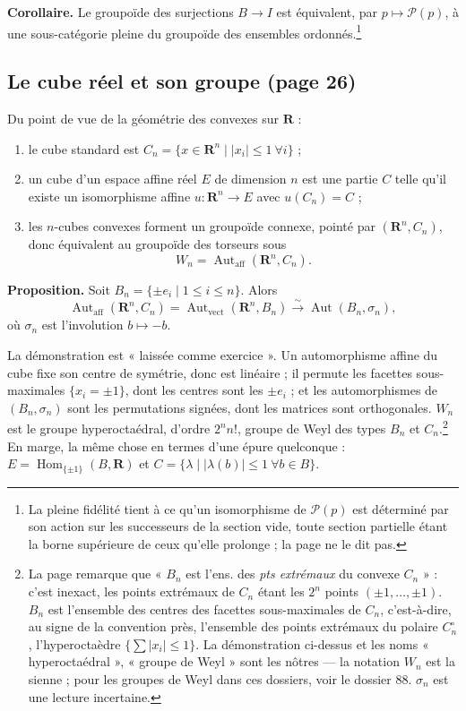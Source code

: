 \documentclass[11pt,a4paper]{article}
\begin{document}
\textbf{Corollaire.} Le groupoïde des surjections $B \to I$ est équivalent, par
$p \mapsto \mathcal{P}(p)$, à une sous-catégorie pleine du groupoïde des
ensembles ordonnés.\footnote{La pleine fidélité tient à ce qu'un isomorphisme
de $\mathcal{P}(p)$ est déterminé par son action sur les successeurs de la
section vide, toute section partielle étant la borne supérieure de ceux
qu'elle prolonge ; la page ne le dit pas.}

\subsection*{Le cube réel et son groupe (page 26)}

Du point de vue de la géométrie des convexes sur $\mathbf{R}$ :
\begin{enumerate}
\item[(a)] le cube standard est $C_{n} = \{x \in \mathbf{R}^{n} \mid |x_{i}| \leq 1
\ \forall i\}$ ;
\item[(b)] un cube d'un espace affine réel $E$ de dimension $n$ est une partie
$C$ telle qu'il existe un isomorphisme affine $u : \mathbf{R}^{n} \to E$ avec
$u(C_{n}) = C$ ;
\item[(c)] les $n$-cubes convexes forment un groupoïde connexe, pointé par
$(\mathbf{R}^{n}, C_{n})$, donc équivalent au groupoïde des torseurs sous
\[
  W_{n} = \operatorname{Aut}_{\mathrm{aff}}(\mathbf{R}^{n}, C_{n}).
\]
\end{enumerate}

\textbf{Proposition.} Soit $B_{n} = \{\pm e_{i} \mid 1 \leq i \leq n\}$. Alors
\[
  \operatorname{Aut}_{\mathrm{aff}}(\mathbf{R}^{n}, C_{n}) =
  \operatorname{Aut}_{\mathrm{vect}}(\mathbf{R}^{n}, B_{n}) \xrightarrow{\ \sim\ }
  \operatorname{Aut}(B_{n}, \sigma_{n}),
\]
où $\sigma_{n}$ est l'involution $b \mapsto -b$.

La démonstration est « laissée comme exercice ». Un automorphisme affine du cube
fixe son centre de symétrie, donc est linéaire ; il permute les facettes
sous-maximales $\{x_{i} = \pm 1\}$, dont les centres sont les $\pm e_{i}$ ; et
les automorphismes de $(B_{n}, \sigma_{n})$ sont les permutations signées, dont
les matrices sont orthogonales. $W_{n}$ est le groupe hyperoctaédral, d'ordre
$2^{n} n!$, groupe de Weyl des types $B_{n}$ et $C_{n}$.\footnote{La page
remarque que « $B_{n}$ est l'ens. des \emph{pts extrémaux} du convexe
$C_{n}$ » : c'est inexact, les points extrémaux de $C_{n}$ étant les $2^{n}$
points $(\pm 1, \ldots, \pm 1)$. $B_{n}$ est l'ensemble des centres des facettes
sous-maximales de $C_{n}$, c'est-à-dire, au signe de la convention près,
l'ensemble des points extrémaux du polaire $C_{n}^{\circ}$, l'hyperoctaèdre
$\{\sum |x_{i}| \leq 1\}$. La démonstration ci-dessus et les noms
« hyperoctaédral », « groupe de Weyl » sont les nôtres --- la notation $W_{n}$ est
la sienne ; pour les groupes de Weyl dans ces dossiers, voir le dossier 88.
$\sigma_{n}$ est une lecture incertaine.} En marge, la même chose en termes
d'une épure quelconque : $E = \operatorname{Hom}_{\{\pm 1\}}(B, \mathbf{R})$ et
$C = \{\lambda \mid |\lambda(b)| \leq 1 \ \forall b \in B\}$.
\end{document}
